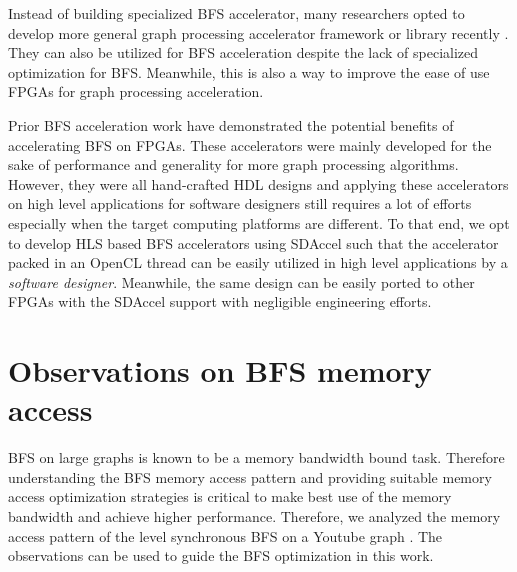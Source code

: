 Instead of building specialized BFS accelerator, many researchers opted to develop 
more general graph processing accelerator framework or library 
recently \cite{engelhardt2016gravf, oguntebi2016graphops, Dai2017foregraph, dai2016fpgp}. 
They can also be utilized for BFS acceleration despite the lack of 
specialized optimization for BFS. Meanwhile, this is also a way to improve 
the ease of use FPGAs for graph processing acceleration.

Prior BFS acceleration work have demonstrated the potential benefits of accelerating 
BFS on FPGAs. These accelerators were mainly developed for the sake 
of performance and generality for more graph processing algorithms. 
However, they were all hand-crafted HDL designs and applying these accelerators 
on high level applications for software designers still requires a lot of 
efforts especially when the target computing platforms are different. 
To that end, we opt to develop HLS based BFS accelerators 
using SDAccel such that the accelerator packed in an 
OpenCL thread can be easily utilized in high level applications 
by a \textit{software designer}. Meanwhile, the same design can be easily 
ported to other FPGAs with the SDAccel support with negligible 
engineering efforts.

\section{Observations on BFS memory access} \label{sec:observation}
BFS on large graphs is known to be a memory bandwidth bound task. 
Therefore understanding the BFS memory access pattern and providing suitable memory 
access optimization strategies is critical to make best use of the memory bandwidth 
and achieve higher performance. Therefore, we analyzed the memory access 
pattern of the level synchronous BFS on a Youtube graph \cite{yang2012defining}.
The observations can be used to guide the BFS optimization in this work.

